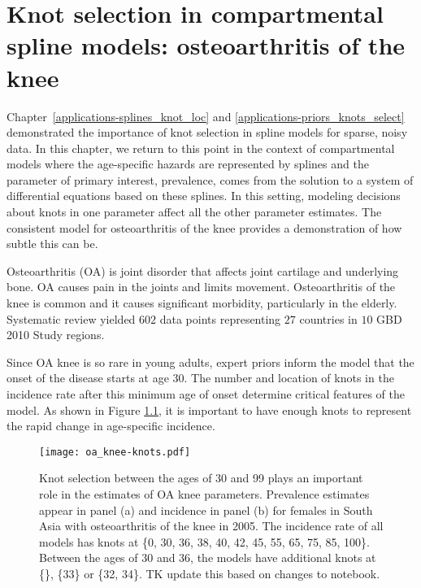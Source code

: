 \chapter{Knot selection in compartmental spline models: osteoarthritis of the knee}
\label{applications-con_fit_splines}

Chapter~\ref{applications-splines_knot_loc} and
\ref{applications-priors_knots_select} demonstrated the importance of
knot selection in spline models for sparse, noisy data. In this
chapter, we return to this point in the context of compartmental
models where the age-specific hazards are represented by splines and
the parameter of primary interest, prevalence, comes from the solution
to a system of differential equations based on these splines. In this
setting, modeling decisions about knots in one parameter affect all
the other parameter estimates.  The consistent model for
osteoarthritis of the knee provides a demonstration of how subtle this
can be.

Osteoarthritis (OA) is joint disorder that affects joint cartilage and
underlying bone.  OA causes pain in the joints and limits movement.
Osteoarthritis of the knee is common and it causes significant
morbidity, particularly in the
elderly. \cite{felson_epidemiology_1988, felson_incidence_1995}
Systematic review yielded $602$ data points representing $27$ countries
in $10$ GBD 2010 Study regions.

Since OA knee is so rare in young adults, expert priors inform the
model that the onset of the disease starts at age 30.  The number and
location of knots in the incidence rate after this minimum age of
onset determine critical features of the model. As shown in Figure
\ref{fig:app-oa knee knots}, it is important to have enough knots to
represent the rapid change in age-specific incidence.

    \begin{figure}[h]
        \begin{center}
            \texttt{[image: oa\_knee-knots.pdf]}
            \caption{Knot selection between the ages of 30 and 99
              plays an important role in the estimates of OA knee
              parameters.  Prevalence estimates appear
              in panel (a) and incidence in panel (b) for females in
              South Asia with osteoarthritis of the knee in 2005.  The
              incidence rate of all models has knots at \{0, 30, 36,
              38, 40, 42, 45, 55, 65, 75, 85, 100\}.  Between the ages
              of 30 and 36, the models have additional knots at \{\}, \{33\} 
              or \{32, 34\}. TK update this based on changes to notebook.}
            \label{fig:app-oa knee knots}
        \end{center}
    \end{figure}

